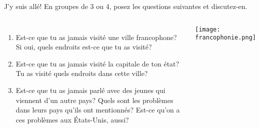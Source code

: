 \begin{frame}{J'y suis allé!}
  En groupes de 3 ou 4, posez les questions suivantes et discutez-en.
  \begin{columns}
      \begin{enumerate}
        \item Est-ce que tu as jamais visité une ville francophone? Si oui, quels endroits est-ce que tu as visité?
        \item Est-ce que tu as jamais visité la capitale de ton état? Tu as visité quels endroits dans cette ville?
        \item Est-ce que tu as jamais parlé avec des jeunes qui viennent d'un autre pays? Quels sont les problèmes dans leurs pays qu'ils ont mentionnés? Est-ce qu'on a ces problèmes aux États-Unis, aussi?
      \end{enumerate}
      \begin{center}
        \texttt{[image: francophonie.png]}
      \end{center}
  \end{columns}
\end{frame}